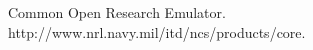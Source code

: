 \documentclass[12pt]{article} %
\begin{document}










\begin{thebibliography}{99} %

Common Open Research Emulator. http://www.nrl.navy.mil/itd/ncs/products/core.  
\end{thebibliography}

\end{document}
